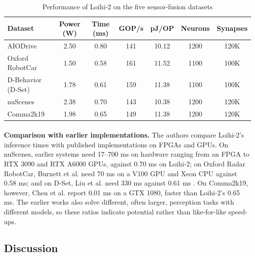 \documentclass[12pt,a4paper,final]{extreport}
\begin{document}
{\renewcommand{\arraystretch}{1.12}
\begin{table}[htbp]
\centering
\caption{Performance of Loihi-2 on the five sensor-fusion datasets \cite{p2}}\label{tab:p2_ds}
\small
\setlength{\tabcolsep}{4pt}
\begin{tabular}{|l|c|c|c|c|c|c|}
\hline
\textbf{Dataset} & \textbf{Power (W)} & \textbf{Time (ms)} & \textbf{GOP/s} & \textbf{pJ/OP} & \textbf{Neurons} & \textbf{Synapses} \\ \hline
AIODrive & 2.50 & 0.80 & 141 & 10.12 & 1200 & 120K \\ \hline
Oxford RobotCar & 1.50 & 0.58 & 161 & 11.52 & 1100 & 100K \\ \hline
D-Behavior (D-Set) & 1.78 & 0.61 & 159 & 11.38 & 1100 & 100K \\ \hline
nuScenes & 2.38 & 0.70 & 143 & 10.38 & 1200 & 120K \\ \hline
Comma2k19 & 1.98 & 0.65 & 149 & 11.38 & 1200 & 120K \\ \hline
\end{tabular}
\end{table}}

\paragraph{} \textbf{Comparison with earlier implementations.} The authors compare Loihi-2's inference times with published implementations on FPGAs and GPUs. On nuScenes, earlier systems need 17--700 ms on hardware ranging from an FPGA to RTX 3090 and RTX A6000 GPUs, against 0.70 ms on Loihi-2; on Oxford Radar RobotCar, Burnett et al. need 70 ms on a V100 GPU and Xeon CPU against 0.58 ms; and on D-Set, Liu et al. need 330 ms against 0.61 ms \cite{p2}. On Comma2k19, however, Chen et al. report 0.01 ms on a GTX 1080, faster than Loihi-2's 0.65 ms. The earlier works also solve different, often larger, perception tasks with different models, so these ratios indicate potential rather than like-for-like speed-ups.

\subsection{Discussion}
\end{document}

